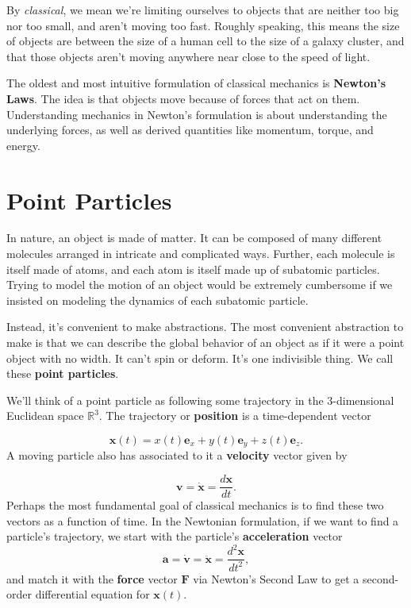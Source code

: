 \documentclass[
  letterpaper,
  DIV=11,
  numbers=noendperiod]{scrreprt}
\begin{document}
By \emph{classical}, we mean we're limiting ourselves to objects that
are neither too big nor too small, and aren't moving too fast. Roughly
speaking, this means the size of objects are between the size of a human
cell to the size of a galaxy cluster, and that those objects aren't
moving anywhere near close to the speed of light.

The oldest and most intuitive formulation of classical mechanics is
\textbf{Newton's Laws}. The idea is that objects move because of forces
that act on them. Understanding mechanics in Newton's formulation is
about understanding the underlying forces, as well as derived quantities
like momentum, torque, and energy.

\hypertarget{point-particles}{%
\section{Point Particles}\label{point-particles}}

In nature, an object is made of matter. It can be composed of many
different molecules arranged in intricate and complicated ways. Further,
each molecule is itself made of atoms, and each atom is itself made up
of subatomic particles. Trying to model the motion of an object would be
extremely cumbersome if we insisted on modeling the dynamics of each
subatomic particle.

Instead, it's convenient to make abstractions. The most convenient
abstraction to make is that we can describe the global behavior of an
object as if it were a point object with no width. It can't spin or
deform. It's one indivisible thing. We call these \textbf{point
particles}.

We'll think of a point particle as following some trajectory in the
3-dimensional Euclidean space \(\mathbb{R}^{3}\). The trajectory or
\textbf{position} is a time-dependent vector

\[
\mathbf{x}(t) = x(t)\mathbf{e}_x + y(t)\mathbf{e}_y + z(t)\mathbf{e}_z.
\] A moving particle also has associated to it a \textbf{velocity}
vector given by

\[
\mathbf{v} = \mathbf{\dot x} = \frac{d\mathbf{x}}{dt}.
\] Perhaps the most fundamental goal of classical mechanics is to find
these two vectors as a function of time. In the Newtonian formulation,
if we want to find a particle's trajectory, we start with the particle's
\textbf{acceleration} vector \[
\mathbf{a} = \mathbf{\dot v} = \mathbf{\ddot x} = \frac{d^2\mathbf{x}}{dt^2},
\] and match it with the \textbf{force} vector \(\mathbf{F}\) via
Newton's Second Law to get a second-order differential equation for
\(\mathbf{x}(t)\).
\end{document}
